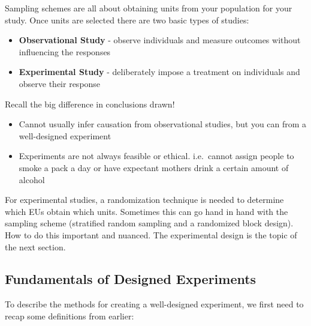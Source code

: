 \documentclass[
]{book}
\theoremstyle{definition}
\theoremstyle{definition}
\theoremstyle{definition}
\theoremstyle{remark}
\begin{document}
Sampling schemes are all about obtaining units from your population for your study. Once units are selected there are two basic types of studies:

\begin{itemize}
\item
  \textbf{Observational Study} - observe individuals and measure outcomes without influencing the responses
\item
  \textbf{Experimental Study} - deliberately impose a treatment on individuals and observe their response
\end{itemize}

Recall the big difference in conclusions drawn!

\begin{itemize}
\item
  Cannot usually infer causation from observational studies, but you can from a well-designed experiment
\item
  Experiments are not always feasible or ethical. i.e.~cannot assign people to smoke a pack a day or have expectant mothers drink a certain amount of alcohol
\end{itemize}

For experimental studies, a randomization technique is needed to determine which EUs obtain which units. Sometimes this can go hand in hand with the sampling scheme (stratified random sampling and a randomized block design). How to do this important and nuanced. The experimental design is the topic of the next section.

\hypertarget{fundamentals-of-designed-experiments}{%
\subsection{Fundamentals of Designed Experiments}\label{fundamentals-of-designed-experiments}}

To describe the methods for creating a well-designed experiment, we first need to recap some definitions from earlier:
\end{document}
